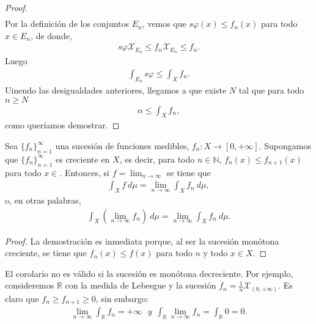 \begin{proof}
\begin{align*}
    \end{align*}
    Por la definición de los conjuntos $E_n$, vemos que $s\varphi(x) \leq f_n(x)$ para todo $x \in E_n$, de donde,
    \begin{align*}
        s\varphi\mathcal{X}_{E_n} \leq f_n\mathcal{X}_{E_n} \leq f_n.
    \end{align*}
    Luego
    \begin{align*}
        \int_{E_n}{s\varphi} \leq \int_{X}{f_n}.
    \end{align*}
    Uinendo las desigualdades anteriores, llegamos a que existe $N$ tal que para todo $n \ge N$
    \begin{align*}
        \alpha \leq \int_{X}{f_n},
    \end{align*}
    como queríamos demostrar.
\end{proof}

\begin{cor}
    Sea  $\{ f_n \}_{n=1}^{\infty}$ una sucesión de funciones medibles, $f_n: X \longrightarrow [0,+\infty]$. Supongamos que $\{ f_n \}_{n=1}^{\infty}$  es creciente en $X$, es decir, para todo $n \in \mathbb{N}$, $f_n(x) \leq f_{n+1}(x)$ para todo $x \in $. Entonces, si $f = \lim_{n \to \infty}$ se tiene que
    \begin{align*}
        \int_{X}{f \ d\mu} = \lim_{n \to \infty}{\int_{X}{f_n \ d\mu}},
    \end{align*}
    o, en otras palabras,
    \begin{align*}
        \int_{X}{\left( \lim_{n \to \infty}{f_n}\right) \ d\mu} = \lim_{n \to \infty}{\int_{X}{f_n \ d\mu}}.
    \end{align*}
\end{cor}

\begin{proof}
    La demostración es inmediata porque, al ser la sucesión monótona creciente, se tiene que $f_n(x) \leq f(x)$ para todo $n$ y todo $x \in X$.
\end{proof}

\begin{obs}
    El corolario no es válido si la sucesión es monótona decreciente. Por ejemplo, consideremos $\mathbb{R}$ con la medida de Lebesgue y la sucesión $f_n = \frac{1}{n}\mathcal{X}_{(0,+\infty)}$. Es claro que $f_n \ge f_{n+1} \ge 0$, sin embargo:
    \begin{align*}
        \lim_{n \to \infty}{\int_{\mathbb{R}}{f_n} = +\infty} \ \ \ y \ \     \int_{\mathbb{R}}{\lim_{n \to \infty}{f_n}} = \int_{\mathbb{R}}{0} = 0.
    \end{align*}
\end{obs}

